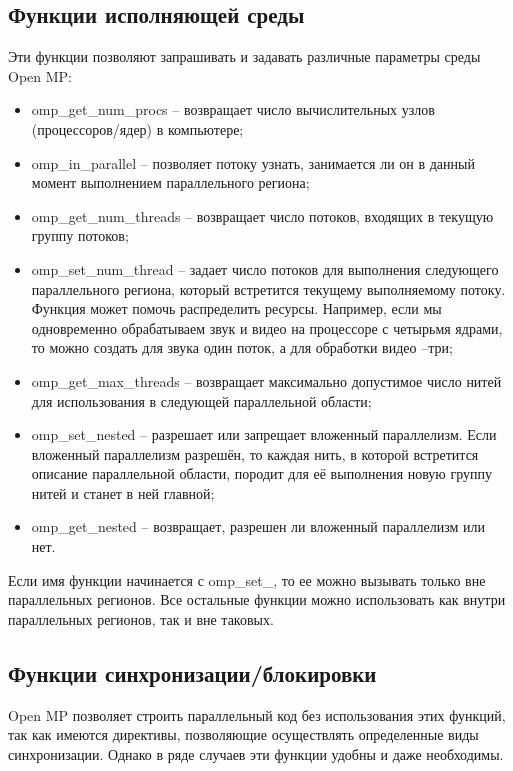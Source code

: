 \documentclass[a4paper, 14pt]{extreport}
\begin{document}
	\subsection{Функции исполняющей среды}
	Эти функции позволяют запрашивать и задавать различные параметры среды Open MP:
	\begin{itemize}
		\item omp\_get\_num\_procs – возвращает число вычислительных узлов (процессоров/ядер) в компьютере;
		\item omp\_in\_parallel – позволяет потоку узнать, занимается ли он в данный момент выполнением параллельного региона;
		\item 	omp\_get\_num\_threads – возвращает число потоков, входящих в текущую группу потоков;
		\item 	omp\_set\_num\_thread – задает число потоков для выполнения следующего параллельного региона, который встретится текущему выполняемому потоку. Функция может помочь распределить ресурсы. Например, если мы одновременно обрабатываем звук и видео на процессоре с четырьмя ядрами, то можно создать для звука один поток, а для обработки видео –три;
		\item 	omp\_get\_max\_threads – возвращает максимально допустимое число нитей для использования в следующей параллельной области;
		\item 	omp\_set\_nested – разрешает или запрещает вложенный параллелизм. Если вложенный параллелизм разрешён, то каждая нить, в которой встретится описание параллельной области, породит для её выполнения новую группу нитей и станет в ней главной;
		\item 	omp\_get\_nested – возвращает, разрешен ли вложенный параллелизм или нет.
	\end{itemize}

	Если имя функции начинается с omp\_set\_, то ее можно вызывать только вне параллельных регионов. Все остальные функции можно использовать как внутри параллельных регионов, так и вне таковых.
	
	\subsection{Функции синхронизации/блокировки}
	Open MP позволяет строить параллельный код без использования этих функций, так как имеются директивы, позволяющие осуществлять определенные виды синхронизации. Однако в ряде случаев эти функции удобны и даже необходимы.
	
\end{document}
